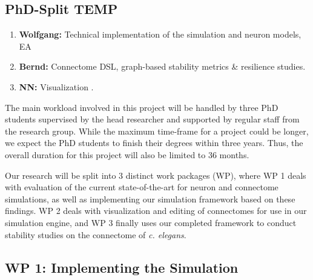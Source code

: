 \documentclass[a4paper,11pt]{article}
\begin{document}
\subsection{PhD-Split TEMP}
\begin{enumerate}
\item \textbf{Wolfgang:} Technical implementation of the simulation and neuron models, EA
\item \textbf{Bernd:} Connectome DSL, graph-based stability metrics \& resilience studies.
\item \textbf{NN:} Visualization .
\end{enumerate}

The main workload involved in this project will be handled by three PhD students
supervised by the head researcher and supported by regular staff from the research group.
While the maximum time-frame for a project could be longer, we expect the PhD students to finish their degrees within three years. Thus, the overall duration for this project will also be limited to 36 months.

Our research will be split into 3 distinct work packages (WP), where WP 1 deals with evaluation of the current state-of-the-art for neuron and connectome simulations, as well as implementing our simulation framework based on these findings. WP 2 deals with visualization and editing of connectomes for use in our simulation engine, and WP 3 finally uses our completed framework to conduct stability studies on the connectome of \emph{c. elegans}.


\subsection{WP 1: Implementing the Simulation}




\end{document}
